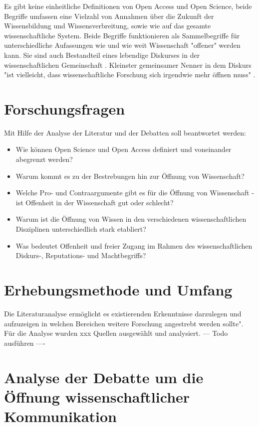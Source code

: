 Es gibt keine einheitliche Definitionen von Open Access und Open Science, beide Begriffe umfassen eine Vielzahl von Annahmen über die Zukunft der Wissensbildung und Wissensverbreitung, sowie wie auf das gesamte wissenschaftliche System. Beide Begriffe funktionieren als Sammelbegriffe für unterschiedliche Aufassungen wie und wie weit Wissenschaft "offener" werden kann. Sie sind auch Bestandteil eines lebendige Diskurses in der wissenschaftlichen Gemeinschaft \cite{schulze_2013_open}. Kleinster gemeinsamer Nenner in dem Diskurs "ist vielleicht, dass wissenschaftliche Forschung sich irgendwie mehr öffnen muss" \cite{cite:9}.

\section{Forschungsfragen} 

Mit Hilfe der Analyse der Literatur und der Debatten soll beantwortet werden: 
\begin{itemize}
\item Wie können Open Science und Open Access definiert und voneinander abegrenzt werden? 
\item Warum kommt es zu der Bestrebungen hin zur Öffnung von Wissenschaft? 
\item Welche Pro- und Contraargumente gibt es für die Öffnung von Wissenschaft - ist Offenheit in der Wissenschaft gut oder schlecht? 
\item Warum ist die Öffnung von Wissen in den verschiedenen wissenschaftlichen Disziplinen unterschiedlich stark etabliert? 
\item Was bedeutet Offenheit und freier Zugang im Rahmen des wissenschaftlichen Diskurs-, Reputations- und Machtbegriffs?
\end{itemize}	

\section{Erhebungsmethode und Umfang} 

Die Literaturanalyse ermöglicht es existierenden Erkenntnisse darzulegen und aufzuzeigen in welchen Bereichen weitere Forschung angestrebt werden sollte"\cite{webster2002analyzing}. Für die Analyse wurden xxx Quellen ausgewählt und analysiert. --- Todo ausführen ----

\section{Analyse der Debatte um die Öffnung wissenschaftlicher Kommunikation} 

